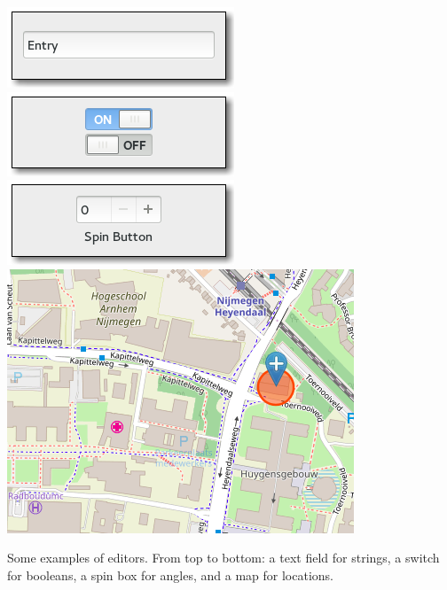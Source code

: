 \begin{marginfigure}
  \centering
  \includegraphics[width=0.7\marginwidth]{figures/text-entry}
  \includegraphics[width=0.7\marginwidth]{figures/switch-button}
  \includegraphics[width=0.7\marginwidth]{figures/spin-button}
  \includegraphics[width=0.7\marginwidth]{figures/map}
  \caption{
    Some examples of editors.
    From top to bottom:
    a text field for strings,
    a switch for booleans,
    a spin box for angles,
    and a map for locations.
  }
  \label{fig:editor-examples}
\end{marginfigure}

